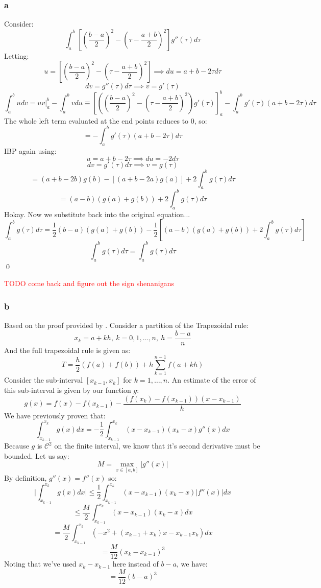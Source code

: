 \documentclass[11pt]{report}
\theoremstyle{definition}
\begin{document}
\subsubsection*{a}
Consider:
\[
	\int_{a}^{b}\left[\left(\frac{b-a}{2}\right)^2-\left(\tau-\frac{a+b}{2}\right)^2\right]g''(\tau)d\tau
\]
Letting:
\[
	u=\left[\left(\frac{b-a}{2}\right)^2-\left(\tau-\frac{a+b}{2}\right)^2\right]
	\implies du = a+b-2\tau d\tau
\]
\[
	dv=g''(\tau)d\tau \implies v = g'(\tau)
\]
\[
	\int_{a}^{b}udv = uv|_a^b-\int_{a}^{b}vdu \equiv
	\left[\left(\left(\frac{b-a}{2}\right)^2-\left(\tau-\frac{a+b}{2}\right)^2\right)
		g'(\tau)
		\right]_a^b
	-\int_{a}^{b}g'(\tau)(a+b-2\tau)d\tau
\]
The whole left term evaluated at the end points reduces to $0$, so:
\[ = -\int_{a}^{b}g'(\tau)(a+b-2\tau)d\tau \]
IBP again using:
\[u = a+b-2\tau \implies du = -2d\tau\]
\[dv = g'(\tau)d\tau \implies v=g(\tau)\]
\[ = (a+b-2b)g(b)-\left[(a+b-2a)g(a)\right]+2\int_{a}^{b}g(\tau)d\tau \]
\[ = (a-b)(g(a)+g(b)) + 2\int_{a}^{b}g(\tau)d\tau\]
Hokay. Now we substitute back into the original equation...
\[
	\int_{a}^{b}g(\tau)d\tau = \frac{1}{2}(b-a)(g(a)+g(b))-\frac{1}{2}
	\left[ (a-b)(g(a)+g(b)) + 2\int_{a}^{b}g(\tau)d\tau \right]
\]
\[
	\int_{a}^{b}g(\tau)d\tau = \int_a^bg(\tau)d\tau
\]
\qed

\textcolor{red}{TODO come back and figure out the sign shenanigans}

\subsubsection*{b}
Based on the proof provided by \cite{Heck_Schut}.
Consider a partition of the Trapezoidal rule:
\[x_k=a+kh,\ k=0,1,\ldots,n,\ h=\frac{b-a}{n}\]
And the full trapezoidal rule is given as:
\[T = \frac{h}{2} (f(a)+f(b))+h\sum_{k=1}^{n-1}f(a+kh)\]
Consider the sub-interval $[x_{k-1}, x_k]$ for $k=1,\ldots,n$. An estimate
of the error of this sub-interval is given by our function $g$:
\[ g(x) = f(x)-f(x_{k-1})-\frac{(f(x_k)-f(x_{k-1}))(x-x_{k-1})}{h} \]
We have previously proven that:
\[\int_{x_{k-1}}^{x_k}g(x)dx = -\frac{1}{2}\int_{x_{k-1}}^{x_k}(x-x_{k-1})(x_k-x)g''(x)dx\]
Because $g$ is $\mathcal{C}^2$ on the finite interval, we know that it's second derivative
must be bounded. Let us say:
\[M = \max_{x\in[a,b]} |g''(x)|\]
By definition, $g''(x) = f''(x)$ so:
\[
	\bigg|\int_{x_{k-1}}^{x_k}g(x)dx\bigg| \leq
	\frac{1}{2}\int_{x_{k-1}}^{x_k}(x-x_{k-1})(x_k-x)|f''(x)|dx
\]
\[ \leq \frac{M}{2}\int_{x_{k-1}}^{x_k}(x-x_{k-1})(x_{k}-x)dx \]
\[ = \frac{M}{2}\int_{x_{k-1}}^{x_k} (-x^2+(x_{k-1}+x_k)x-x_{k-1}x_k) dx \]
\[=\frac{M}{12}(x_k-x_{k-1})^3\]
Noting that we've used $x_k-x_{k-1}$ here instead of $b-a$, we have:
\[=\frac{M}{12}(b-a)^3\]
\end{document}
